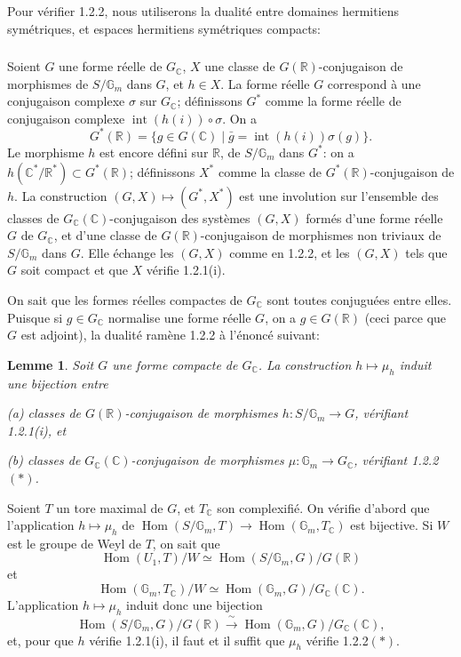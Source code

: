 \documentclass[12pt,a4paper]{article}
\theoremstyle{plain}
\newtheorem{lemma}[theorem]{Lemme}
\theoremstyle{definition}
\theoremstyle{remark}
\DeclareMathOperator{\Hom}{Hom}
\DeclareMathOperator{\Int}{int}
\newcommand{\RR}{\mathbb{R}}
\newcommand{\CC}{\mathbb{C}}
\newcommand{\Gm}{\mathbb{G}}
\begin{document}
Pour v\'erifier 1.2.2, nous utiliserons la dualit\'e entre domaines hermitiens sym\'etriques, et espaces hermitiens sym\'etriques compacts:

\subsubsection{}

Soient $G$ une forme r\'eelle de $G_{\CC}$, $X$ une classe de $G(\RR)$-conjugaison de morphismes de $S/\Gm_m$ dans $G$, et $h \in X$. La forme r\'eelle $G$ correspond \`a une conjugaison complexe $\sigma$ sur $G_{\CC}$; d\'efinissons $G^*$ comme la forme r\'eelle de conjugaison complexe $\Int(h(i))\circ\sigma$. On a
\[
G^*(\RR) = \{g \in G(\CC) \mid \bar{g} = \Int(h(i))\sigma(g)\}.
\]
Le morphisme $h$ est encore d\'efini sur $\RR$, de $S/\Gm_m$ dans $G^*$: on a $h(\CC^*/\RR^*) \subset G^*(\RR)$; d\'efinissons $X^*$ comme la classe de $G^*(\RR)$-conjugaison de $h$. La construction $(G,X) \mapsto (G^*,X^*)$ est une involution sur l'ensemble des classes de $G_{\CC}(\CC)$-conjugaison des syst\`emes $(G,X)$ form\'es d'une forme r\'eelle $G$ de $G_{\CC}$, et d'une classe de $G(\RR)$-conjugaison de morphismes non triviaux de $S/\Gm_m$ dans $G$. Elle \'echange les $(G,X)$ comme en 1.2.2, et les $(G,X)$ tels que $G$ soit compact et que $X$ v\'erifie 1.2.1(i).

On sait que les formes r\'eelles compactes de $G_{\CC}$ sont toutes conjugu\'ees entre elles. Puisque si $g \in G_{\CC}$ normalise une forme r\'eelle $G$, on a $g \in G(\RR)$ (ceci parce que $G$ est adjoint), la dualit\'e ram\`ene 1.2.2 \`a l'\'enonc\'e suivant:

\begin{lemma}
Soit $G$ une forme compacte de $G_{\CC}$. La construction $h \mapsto \mu_h$ induit une bijection entre

\textup{(a)} classes de $G(\RR)$-conjugaison de morphismes $h:S/\Gm_m \to G$, v\'erifiant 1.2.1(i), et

\textup{(b)} classes de $G_{\CC}(\CC)$-conjugaison de morphismes $\mu:\Gm_m \to G_{\CC}$, v\'erifiant 1.2.2$(*)$.
\end{lemma}

Soient $T$ un tore maximal de $G$, et $T_{\CC}$ son complexifi\'e. On v\'erifie d'abord que l'application $h \mapsto \mu_h$ de $\Hom(S/\Gm_m,T) \to \Hom(\Gm_m,T_{\CC})$ est bijective. Si $W$ est le groupe de Weyl de $T$, on sait que
\[
\Hom(U_1,T)/W \simeq \Hom(S/\Gm_m,G)/G(\RR)
\]
et
\[
\Hom(\Gm_m,T_{\CC})/W \simeq \Hom(\Gm_m,G)/G_{\CC}(\CC).
\]
L'application $h \mapsto \mu_h$ induit donc une bijection
\[
\Hom(S/\Gm_m,G)/G(\RR) \xrightarrow{\;\sim\;} \Hom(\Gm_m,G)/G_{\CC}(\CC),
\]
et, pour que $h$ v\'erifie 1.2.1(i), il faut et il suffit que $\mu_h$ v\'erifie 1.2.2$(*)$.
\end{document}
